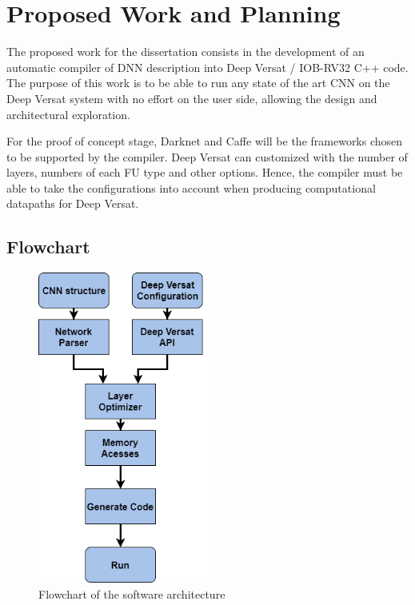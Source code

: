 \chapter{Proposed Work and Planning}
\label{chapter:PWP}

The proposed work for the dissertation consists in the development of an
automatic compiler of DNN description into Deep Versat / IOB-RV32 C++ code. The
purpose of this work is to be able to run any state of the art CNN on the Deep
Versat system with no effort on the user side, allowing the design and
architectural exploration.

For the proof of concept stage, Darknet and Caffe will be the frameworks chosen
to be supported by the compiler. Deep Versat can customized with the number of
layers, numbers of each FU type and other options. Hence, the compiler must be
able to take the configurations into account when producing computational
datapaths for Deep Versat.

\section{Flowchart}

\begin{figure}[!htb]
    \centering
    \includegraphics[width=0.5\textwidth]{Figures/flowchart.png}
    \caption{Flowchart of the software architecture}
    \label{figure:flowchart}
\end{figure}



